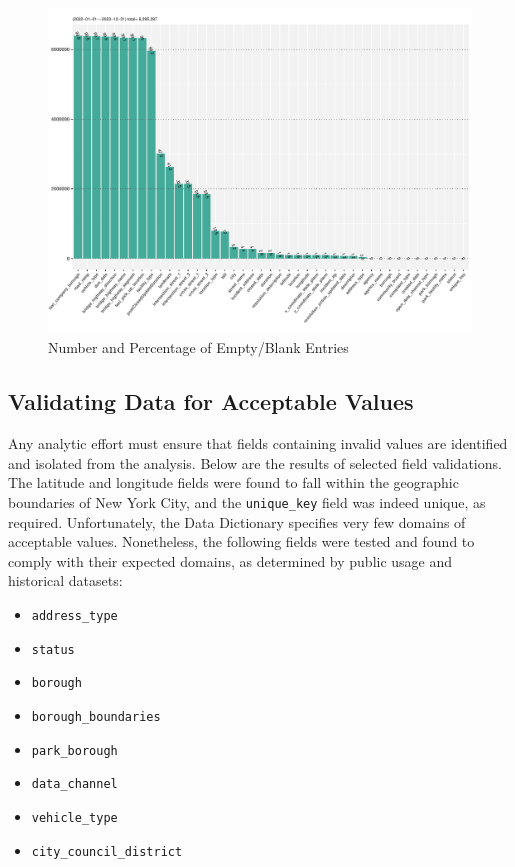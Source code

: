 \documentclass[linenumber]{jdsart}
\begin{document}
\begin{figure}[tbp]
	\centering
  	\includegraphics[width=\textwidth]{BlankFields.pdf}
	\caption{Number and Percentage of Empty/Blank Entries}
	\label{fig:blank_fields}
\end{figure}


\subsection{Validating Data for Acceptable Values}
\label{sec:domain}
Any analytic effort must ensure that fields containing invalid values 
are identified and isolated from the analysis. Below are the results of 
selected field validations. The latitude and longitude fields were 
found to fall within the geographic boundaries of New York City, and 
the \texttt{unique\_key} field was indeed unique, as required. 
Unfortunately, the Data Dictionary specifies very few domains of 
acceptable values. Nonetheless, the following fields were tested and found 
to comply with their expected domains, as determined by public usage 
and historical datasets:

\begin{itemize}
    \item \texttt{address\_type}
    \item \texttt{status}
    \item \texttt{borough}
    \item \texttt{borough\_boundaries}
    \item \texttt{park\_borough}
    \item \texttt{data\_channel}
    \item \texttt{vehicle\_type}
    \item \texttt{city\_council\_district}
\end{itemize}
\end{document}
